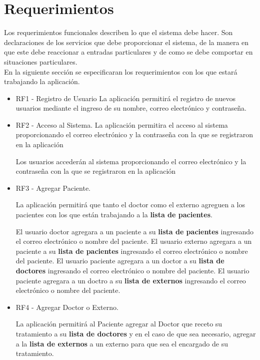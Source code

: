\section{Requerimientos}
Los requerimientos funcionales describen lo que el sistema debe hacer. Son declaraciones de los servicios que debe proporcionar el sistema, de la manera en que este debe reaccionar a entradas particulares y de como se debe comportar en situaciones particulares.\\
En la siguiente sección se especificaran los requerimientos con los que estará trabajando la aplicación.\\
\begin{itemize}
		\item RF1 - Registro de Usuario
		La aplicación permitirá el registro de nuevos usuarios mediante el ingreso de su nombre, correo electrónico y contraseña.
		
		\item RF2 - Acceso al Sistema.
		La aplicación permitira el acceso al sistema proporcionando el correo electrónico y la contraseña con la que se registraron en la aplicación
		
		Los usuarios accederán al sistema proporcionando el correo electrónico y la contraseña con la que se registraron en la aplicación
		
		\item RF3 - Agregar Paciente.
		 
		 La aplicación permitirá que tanto el doctor como el externo agreguen a los pacientes con los que están trabajando a la \textbf{lista de pacientes}.
		 
		El usuario doctor agregara a un paciente a su \textbf{lista de pacientes} ingresando el correo electrónico o nombre del paciente.
		El usuario externo agregara a un paciente a su \textbf{lista de pacientes} ingresando el correo electrónico o nombre del paciente.
		El usuario paciente agregara a un doctor a su \textbf{lista de doctores} ingresando el correo electrónico o nombre del paciente.
		El usuario paciente agregara a un doctro a su \textbf{lista de externos} ingresando el correo electrónico o nombre del paciente.
	
		\item RF4 - Agregar Doctor o Externo.
		
		La aplicación permitirá al Paciente agregar al Doctor que receto su tratamiento a su \textbf{lista de doctores} y en el caso de que sea necesario, agregar a la \textbf{lista de externos} a un externo para que sea el encargado de su tratamiento.
		

\end{itemize}
